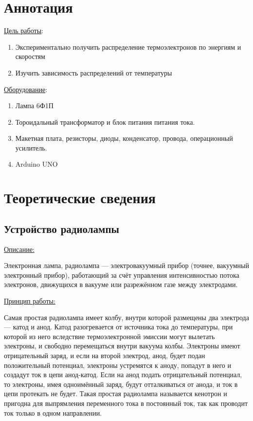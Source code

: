 \section{Аннотация}

\underline{Цель работы}: 
\begin{enumerate}
    \item Экспериментально получить распределение термоэлектронов по энергиям и скоростям
    \item Изучить зависимость распределений от температуры
\end{enumerate} \par
\underline{Оборудование}:
\begin{enumerate}
    \item Лампа 6Ф1П
    \item Тороидальный трансформатор и блок питания питания тока.
    \item Макетная плата, резисторы, диоды, конденсатор, провода, операционный усилитель.
    \item Arduino UNO
\end{enumerate} 
\newpage

\section{Теоретические сведения}
\subsection{Устройство радиолампы}

\underline{Описание:}
\par
Электронная лампа, радиолампа — электровакуумный прибор (точнее, вакуумный электронный прибор), работающий за счёт управления интенсивностью потока электронов, движущихся в вакууме или разрежённом газе между электродами.

\underline{Принцип работы:}
\par

Самая простая радиолампа имеет колбу, внутри которой размещены два электрода — катод и анод. Катод разогревается от источника тока до температуры, при которой из него вследствие термоэлектронной эмиссии могут вылетать электроны, и свободно перемещаться внутри вакуума колбы. Электроны имеют отрицательный заряд, и если на второй электрод, анод, будет подан положительный потенциал, электроны устремятся к аноду, попадут в него и создадут ток в цепи анод-катод. Если на анод подать отрицательный потенциал, то электроны, имея одноимённый заряд, будут отталкиваться от анода, и ток в цепи протекать не будет. Такая простая радиолампа называется кенотрон и пригодна для выпрямления переменного тока в постоянный ток, так как проводит ток только в одном направлении.

